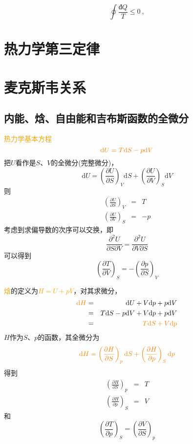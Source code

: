 \documentclass[11pt,a4paper]{article}
\newcommand{\dif}{\mathrm{d}}
\begin{document}
\begin{equation}
\oint \frac{\text{đ} Q}{T} \leqslant 0 ~,
\end{equation}





\section{热力学第三定律}



\section{麦克斯韦关系}
\subsection{内能、焓、自由能和吉布斯函数的全微分}
\textcolor{orange}{热力学基本方程}
\begin{equation}
\color{orange} \dif U = T \dif S - p \dif V
\end{equation}
把$U$看作是$S$、$V$的全微分(完整微分)，
\begin{equation*}
\dif U = \left( \frac{\partial U}{\partial S}\right)_V \dif S +\left( \frac{\partial U}{\partial V}\right)_S \dif V
\end{equation*}
则
\begin{eqnarray}
\left( \frac{\partial U}{\partial S}\right)_V &=& T \\
\left( \frac{\partial U}{\partial V}\right)_S &=& -p
\end{eqnarray}
考虑到求偏导数的次序可以交换，即
\begin{equation*}
\frac{\partial^2 U}{\partial S\partial V} = \frac{\partial^2 U}{\partial V\partial S}
\end{equation*}
可以得到
\begin{equation}
\left( \frac{\partial T}{\partial V}\right)_S = -\left( \frac{\partial p}{\partial S}\right)_V
\end{equation}

\textcolor{orange}{焓}的定义为\textcolor{orange}{$H=U+pV$}，对其求微分，
\begin{eqnarray}
\nonumber \color{orange} \dif H &=& \dif U + V\dif p +p \dif V \\
\nonumber &=& T\dif S -p\dif V + V\dif p +p \dif V \\
&=& \color{orange} T\dif S  +V\dif p
\end{eqnarray}
$H$作为$S$、$p$的函数，其全微分为
\begin{equation*}
\color{orange} \dif H = \left( \frac{\partial H}{\partial S}\right)_p \dif S +\left( \frac{\partial H}{\partial p}\right)_S \dif p
\end{equation*}
得到
\begin{eqnarray}
\left( \frac{\partial H}{\partial S}\right)_p &=& T \\
\left( \frac{\partial H}{\partial p}\right)_S &=& V
\end{eqnarray}
和
\begin{equation}
\left( \frac{\partial T}{\partial p}\right)_S = \left( \frac{\partial V}{\partial S}\right)_p
\end{equation}
\end{document}
